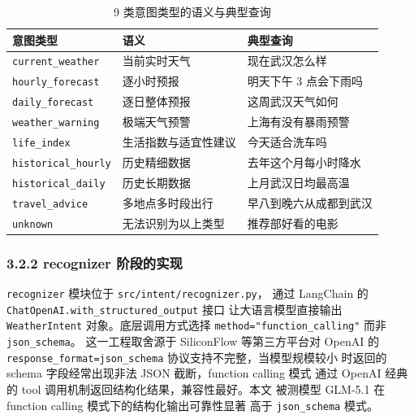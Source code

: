 \begin{table}[!ht]
    \centering
    \caption{9 类意图类型的语义与典型查询}
    \label{tab:intent-types}
    \song\fontsize{9pt}{12pt}\selectfont
    \renewcommand{\arraystretch}{0.95}
    \begin{tabular}{lll}
        \toprule
        意图类型 & 语义 & 典型查询 \\
        \midrule
        \texttt{current\_\bk{}weather} & 当前实时天气 & 现在武汉怎么样 \\
        \texttt{hourly\_\bk{}forecast} & 逐小时预报 & 明天下午 3 点会下雨吗 \\
        \texttt{daily\_\bk{}forecast} & 逐日整体预报 & 这周武汉天气如何 \\
        \texttt{weather\_\bk{}warning} & 极端天气预警 & 上海有没有暴雨预警 \\
        \texttt{life\_\bk{}index} & 生活指数与适宜性建议 & 今天适合洗车吗 \\
        \texttt{historical\_\bk{}hourly} & 历史精细数据 & 去年这个月每小时降水 \\
        \texttt{historical\_\bk{}daily} & 历史长期数据 & 上月武汉日均最高温 \\
        \texttt{travel\_\bk{}advice} & 多地点多时段出行 & 早八到晚六从成都到武汉 \\
        \texttt{unknown} & 无法识别为以上类型 & 推荐部好看的电影 \\
        \bottomrule
    \end{tabular}
\end{table}

\subsubsection*{3.2.2 \quad recognizer 阶段的实现}

\texttt{recognizer} 模块位于 \texttt{src/\bk{}intent/\bk{}recognizer.\bk{}py}，
通过 LangChain 的 \texttt{ChatOpenAI.\bk{}with\_\bk{}structured\_\bk{}output} 接口
让大语言模型直接输出 \texttt{WeatherIntent} 对象。底层调用方式选择
\texttt{method=\bk{}"function\_\bk{}calling"} 而非 \texttt{json\_\bk{}schema}。
这一工程取舍源于 SiliconFlow 等第三方平台对 OpenAI 的
\texttt{response\_\bk{}format=\bk{}json\_\bk{}schema} 协议支持不完整，当模型规模较小
时返回的 schema 字段经常出现非法 JSON 截断，function calling 模式
通过 OpenAI 经典的 tool 调用机制返回结构化结果，兼容性最好。本文
被测模型 GLM-5.1 在 function calling 模式下的结构化输出可靠性显著
高于 \texttt{json\_\bk{}schema} 模式。

